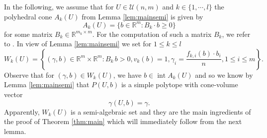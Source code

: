 \documentclass[11pt, a4paper, twoside, reqno]{amsart}
\DeclareMathOperator*{\inter}{int}
\newcommand{\R}{\mathbb{R}}
\theoremstyle{definition}
\theoremstyle{remark}
\numberwithin{equation}{section}
\begin{document}
\vspace{\baselineskip}
In the following, we assume that for $U\in\mathcal{U}(n,m)$ and
 $k\in\{1,\cdots,l\}$ the polyhedral cone  $A_k(U)$ from Lemma \ref{lem:mainsemi} is given by
\begin{equation*}
               A_k(U)=\{b\in\R^m: B_k \cdot b\geq 0\}
\end{equation*}
for some matrix $B_k\in\R^{m_k\times m}$. For the  computation of such a matrix $B_k$, we refer to  \cite{fillastre2017shapes}. In view of Lemma \ref{lem:mainsemi} we set for $1\leq k\leq l$
\begin{equation}
  W_k(U)=\left\{ (\gamma,b) \in\R^m \times \R^m : B_k\,b >0,  v_k(b)=1,
    \gamma_i=  \frac{f_{k,i}(b)\cdot b_i}{n}, 1\leq i\leq m\right\}.
\label{eq:conevolumevectorstype}  
\end{equation}
Observe that for $(\gamma,b)\in  W_k(U)$, we have $b\in\inter A_k(U)$ and so we know by Lemma \ref{lem:mainsemi}  that $P(U,b)$ is a simple polytope with cone-volume vector
\begin{equation*}
                  \gamma(U,b)=\gamma.
\end{equation*}
Apparently, $W_k(U)$ is a semi-algebraic set and they are the main
ingredients of the proof of  Theorem \ref{thm:main} which will
immediately follow from the next lemma.
\end{document}
